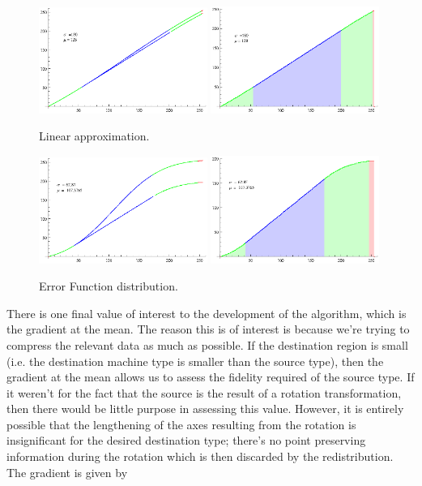 \begin{figure}[h!]
  \centering
    \includegraphics[width=0.49\textwidth]{Chapter2/Figs/linearSmooth2.eps}
    \includegraphics[width=0.49\textwidth]{Chapter2/Figs/linearColor2.eps}
    \caption{Linear approximation.}  \label{fig:Linear}
\end{figure}

\begin{figure}[h!]
  \centering
    \includegraphics[width=0.49\textwidth]{Chapter2/Figs/ERFSmooth2.eps}
    \includegraphics[width=0.49\textwidth]{Chapter2/Figs/ERFColor2.eps}
    \caption{Error Function distribution.}  \label{fig:ERF}
\end{figure}

There is one final value of interest to the development of the algorithm, which is the gradient at the mean. The reason this is of interest is because we're trying to compress the relevant data as much as possible. If the destination region is small (i.e. the destination machine type is smaller than the source type), then the gradient at the mean allows us to assess the fidelity required of the source type. If it weren't for the fact that the source is the result of a rotation transformation, then there would be little purpose in assessing this value. However, it is entirely possible that the lengthening of the axes resulting from the rotation is insignificant for the desired destination type; there's no point preserving information during the rotation which is then discarded by the redistribution. The gradient is given by

